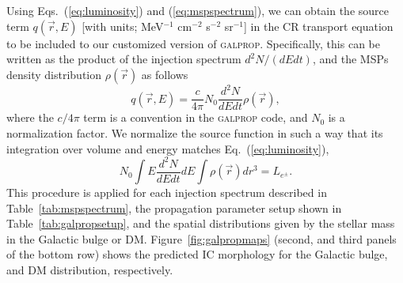 \documentclass[doublespace,nopageskip]{VTthesis} %
\begin{document}
Using Eqs.~(\ref{eq:luminosity}) and (\ref{eq:mspspectrum}), we can obtain the source term $q(\vec{r},E)$ [with units; MeV$^{-1}$ cm$^{-2}$ s$^{-2}$ sr$^{-1}$] in the CR transport equation to be included to our customized version of \textsc{galprop}. Specifically, this can be written as the product of the injection spectrum $d^2N/(dEdt)$, and the MSPs density distribution $\rho(\vec{r})$ as follows 
\begin{equation}\label{eq:sourcefunction}
  q(\vec{r},E) = \frac{c}{4\pi} N_0 \dfrac{d^2N}{dEdt}\rho(\vec{r}),
\end{equation}
where the $c/4\pi$ term is a convention in the \textsc{galprop} code, and $N_0$ is a normalization factor. We normalize the source function in such a way that its integration over volume and energy matches Eq.~(\ref{eq:luminosity}),
\begin{equation}
  \label{eq:norm}
  N_0 \int E\dfrac{d^2N}{dEdt}dE \int\rho(\vec{r})dr^3 = L_{e^\pm}. 
\end{equation}
This procedure is applied for each injection spectrum described in Table~\ref{tab:mspspectrum}, the propagation parameter setup shown in Table~\ref{tab:galpropsetup}, and the spatial distributions given by the stellar mass in the Galactic bulge or DM. Figure~\ref{fig:galpropmaps} (second, and third panels of the bottom row) shows the predicted IC morphology for the Galactic bulge, and DM distribution, respectively.
\end{document}

